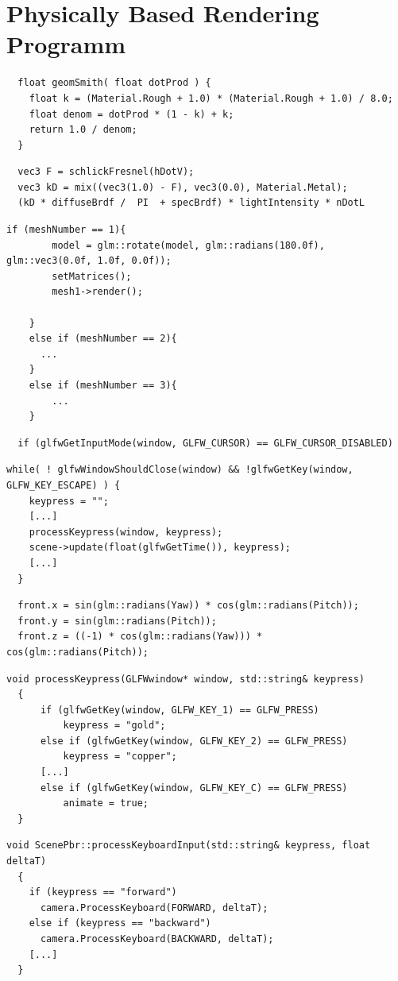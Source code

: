 \documentclass[
  11pt,
  a4paper,
  oneside
  ]{article}
\begin{document}
\section{Physically Based Rendering Programm}


\begin{lstlisting}
  float geomSmith( float dotProd ) {
    float k = (Material.Rough + 1.0) * (Material.Rough + 1.0) / 8.0;
    float denom = dotProd * (1 - k) + k;
    return 1.0 / denom;
  }
\end{lstlisting}
\begin{lstlisting}
  vec3 F = schlickFresnel(hDotV);         
  vec3 kD = mix((vec3(1.0) - F), vec3(0.0), Material.Metal);
  (kD * diffuseBrdf /  PI  + specBrdf) * lightIntensity * nDotL
\end{lstlisting}
\begin{lstlisting}[tabsize=2]
  if (meshNumber == 1){
		model = glm::rotate(model, glm::radians(180.0f), glm::vec3(0.0f, 1.0f, 0.0f));
		setMatrices();
		mesh1->render();

	}
	else if (meshNumber == 2){
	  ...
	}
	else if (meshNumber == 3){
		...
	}
\end{lstlisting}
\begin{lstlisting}
  if (glfwGetInputMode(window, GLFW_CURSOR) == GLFW_CURSOR_DISABLED)
\end{lstlisting}
\begin{lstlisting}[tabsize=2]
  while( ! glfwWindowShouldClose(window) && !glfwGetKey(window, GLFW_KEY_ESCAPE) ) {
    keypress = "";
    [...]
    processKeypress(window, keypress);
    scene->update(float(glfwGetTime()), keypress);
    [...]
  }
\end{lstlisting}
\begin{lstlisting}
  front.x = sin(glm::radians(Yaw)) * cos(glm::radians(Pitch));
  front.y = sin(glm::radians(Pitch));
  front.z = ((-1) * cos(glm::radians(Yaw))) * cos(glm::radians(Pitch));
\end{lstlisting}
\begin{lstlisting}[tabsize=2]
  void processKeypress(GLFWwindow* window, std::string& keypress)
  {
      if (glfwGetKey(window, GLFW_KEY_1) == GLFW_PRESS)
          keypress = "gold";
      else if (glfwGetKey(window, GLFW_KEY_2) == GLFW_PRESS)
          keypress = "copper";
      [...]
      else if (glfwGetKey(window, GLFW_KEY_C) == GLFW_PRESS)
          animate = true;
  }
\end{lstlisting}
\begin{lstlisting}[tabsize=2]
  void ScenePbr::processKeyboardInput(std::string& keypress, float deltaT)
  {
    if (keypress == "forward")
      camera.ProcessKeyboard(FORWARD, deltaT);
    else if (keypress == "backward")
      camera.ProcessKeyboard(BACKWARD, deltaT);
    [...]
  }
\end{lstlisting}
\end{document}
